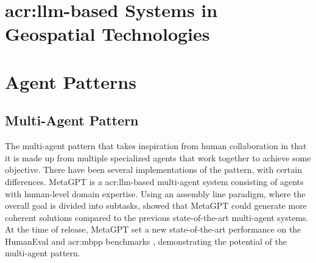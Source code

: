 \begin{comment}
Note that a reference needs to be complete: you should always give the full name of a conference or journal,
always include page numbers, always say where a book or thesis was published, and where a conference took place, as further described in Section~\ref{sec:reference_list}.

Just as described in the Background chapter (Chapter~\ref{cha:background_theory}), it is possible (and even likely) that you will want to reuse some of the text that you have written for your specialisation project in your Master's Thesis.
This is allowed, as long as it is clearly stated what you have reused and in what form (e.g., if a section is a straight-forward copy, if it has undergone only editorial changes, if it contains some old material but also some new, etc.).
\end{comment}


\section[LLM-based Systems in Geospatial Technologies]{\acrshort{acr:llm}-based Systems in Geospatial Technologies}


\section{Agent Patterns}
\label{sec:agent-patterns}

\subsection{Multi-Agent Pattern}

The multi-agent pattern that takes inspiration from human collaboration in that it is made up from multiple specialized agents that work together to achieve some objective. There have been several implementations of the pattern, with certain differences. MetaGPT \citep{hongMetaGPTMetaProgramming2023} is a \acrshort{acr:llm}-based multi-agent system consisting of agents with human-level domain expertise. Using an assembly line paradigm, where the overall goal is divided into subtasks, \citeauthor{hongMetaGPTMetaProgramming2023} showed that MetaGPT could generate more coherent solutions compared to the previous state-of-the-art multi-agent systems. At the time of release, MetaGPT set a new state-of-the-art performance on the HumanEval and \acrshort{acr:mbpp} benchmarks \citep[7]{hongMetaGPTMetaProgramming2023}, demonstrating the potential of the multi-agent pattern.



